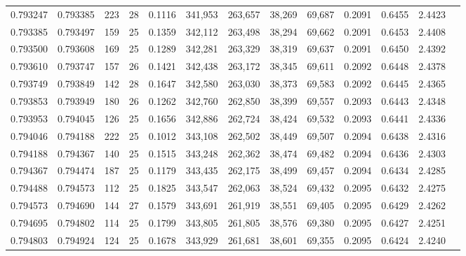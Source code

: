 \begin{tabular}{rrrrrrrrrrrrr}
0.793247 & 0.793385 &   223 &  28 &                                     0.1116 & 341,953 & 263,657 &  38,269 &  69,687 & 0.2091 & 0.6455 & 2.4423 \\
0.793385 & 0.793497 &   159 &  25 &                                     0.1359 & 342,112 & 263,498 &  38,294 &  69,662 & 0.2091 & 0.6453 & 2.4408 \\
0.793500 & 0.793608 &   169 &  25 &                                     0.1289 & 342,281 & 263,329 &  38,319 &  69,637 & 0.2091 & 0.6450 & 2.4392 \\
0.793610 & 0.793747 &   157 &  26 &                                     0.1421 & 342,438 & 263,172 &  38,345 &  69,611 & 0.2092 & 0.6448 & 2.4378 \\
0.793749 & 0.793849 &   142 &  28 &                                     0.1647 & 342,580 & 263,030 &  38,373 &  69,583 & 0.2092 & 0.6445 & 2.4365 \\
0.793853 & 0.793949 &   180 &  26 &                                     0.1262 & 342,760 & 262,850 &  38,399 &  69,557 & 0.2093 & 0.6443 & 2.4348 \\
0.793953 & 0.794045 &   126 &  25 &                                     0.1656 & 342,886 & 262,724 &  38,424 &  69,532 & 0.2093 & 0.6441 & 2.4336 \\
0.794046 & 0.794188 &   222 &  25 &                                     0.1012 & 343,108 & 262,502 &  38,449 &  69,507 & 0.2094 & 0.6438 & 2.4316 \\
0.794188 & 0.794367 &   140 &  25 &                                     0.1515 & 343,248 & 262,362 &  38,474 &  69,482 & 0.2094 & 0.6436 & 2.4303 \\
0.794367 & 0.794474 &   187 &  25 &                                     0.1179 & 343,435 & 262,175 &  38,499 &  69,457 & 0.2094 & 0.6434 & 2.4285 \\
0.794488 & 0.794573 &   112 &  25 &                                     0.1825 & 343,547 & 262,063 &  38,524 &  69,432 & 0.2095 & 0.6432 & 2.4275 \\
0.794573 & 0.794690 &   144 &  27 &                                     0.1579 & 343,691 & 261,919 &  38,551 &  69,405 & 0.2095 & 0.6429 & 2.4262 \\
0.794695 & 0.794802 &   114 &  25 &                                     0.1799 & 343,805 & 261,805 &  38,576 &  69,380 & 0.2095 & 0.6427 & 2.4251 \\
0.794803 & 0.794924 &   124 &  25 &                                     0.1678 & 343,929 & 261,681 &  38,601 &  69,355 & 0.2095 & 0.6424 & 2.4240 \\

\end{tabular}
